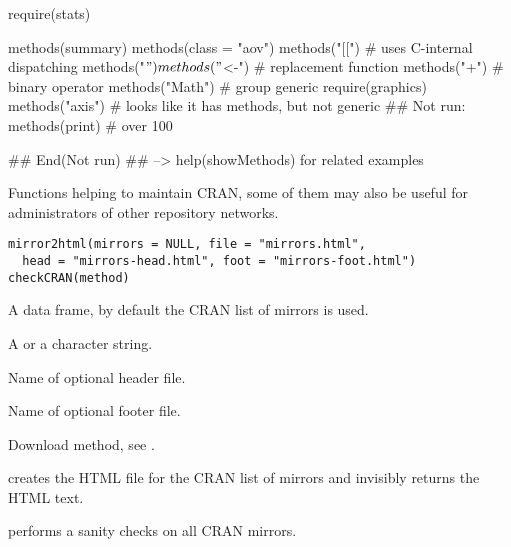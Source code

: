 %
\begin{Examples}
\begin{ExampleCode}
require(stats)

methods(summary)
methods(class = "aov")
methods("[[")    # uses C-internal dispatching
methods("$")
methods("$<-")   # replacement function
methods("+")     # binary operator
methods("Math")  # group generic
require(graphics)
methods("axis")  # looks like it has methods, but not generic
## Not run: 
methods(print)   # over 100

## End(Not run)
## --> help(showMethods) for related examples
\end{ExampleCode}
\end{Examples}
%
\begin{Description}\relax
Functions helping to maintain CRAN, some of them may also be useful
for administrators of other repository networks.
\end{Description}
%
\begin{Usage}
\begin{verbatim}
mirror2html(mirrors = NULL, file = "mirrors.html",
  head = "mirrors-head.html", foot = "mirrors-foot.html")
checkCRAN(method)
\end{verbatim}
\end{Usage}
%
\begin{Arguments}
\begin{ldescription}
\item[\code{mirrors}] A data frame, by default the CRAN list of mirrors is used.
\item[\code{file}] A  or a character string.
\item[\code{head}] Name of optional header file.
\item[\code{foot}] Name of optional footer file.
\item[\code{method}] Download method, see .
\end{ldescription}
\end{Arguments}
%
\begin{Details}\relax
{} creates the HTML file for the CRAN list of mirrors
and invisibly returns the HTML text.

 performs a sanity checks on all CRAN mirrors.
\end{Details}
